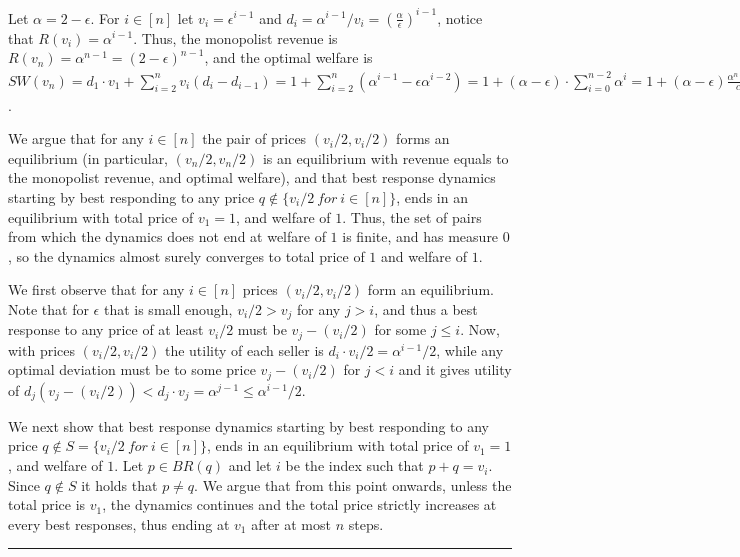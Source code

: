 \documentclass[11pt,a4paper]{article}
\newcommand{\qed}{\rule{1.5mm}{2mm}\vspace{0.1in}}
\newenvironment{proof}{\par\noindent{\bf Proof:}}{\qed}
\begin{document}
\begin{proof}
	Let $\alpha=2-\epsilon$.
	For $i\in [n]$ let $v_i=\epsilon^{i-1} $ and $d_i=\alpha^{i-1}/v_i = \left(\frac{\alpha}{\epsilon}\right)^{i-1}$, notice that $R(v_i)=\alpha^{i-1}$. Thus, the monopolist revenue is $R(v_n)=\alpha^{n-1} = (2-\epsilon)^{n-1}$, and the optimal welfare is
	$SW(v_n) = d_1\cdot v_1+ \sum_{i=2}^n v_i (d_{i}-d_{i-1}) = %
	1+ \sum_{i=2}^n \left(\alpha^{i-1}- \epsilon \alpha^{i-2}\right) =
	1+ (\alpha - \epsilon)\cdot \sum_{i=0}^{n-2} \alpha^{i} =
	1+ (\alpha - \epsilon)\frac{\alpha^{n-1} - 1 }{\alpha -1 } = 1+ 2 (1 - \epsilon)\frac{(2-\epsilon)^{n-1}-1}{1-\epsilon} =
	1+ 2\cdot ((2-\epsilon)^{n-1}-1)  =  2\cdot (2-\epsilon)^{n-1}-1   $.
	
	We argue that for any $i\in [n]$ the pair of prices $(v_i/2, v_i/2)$ forms an equilibrium (in particular, $(v_n/2, v_n/2)$ is an equilibrium with revenue equals to the monopolist revenue, and optimal welfare),
	and that best response dynamics starting by best responding to any price $q\notin \{v_i/2 \ for \ i\in [n]\}$, ends in an equilibrium with total price of $v_1=1$, and welfare of $1$. Thus, the set of pairs from which the dynamics does not end at welfare of $1$ is finite, and has measure $0$, so the dynamics almost surely converges to total price of $1$ and welfare of $1$.
	
	We first observe that for any $i\in [n]$ prices $(v_i/2, v_i/2)$ form an equilibrium.
	Note that for $\epsilon$ that is small enough, $v_i/2>v_j$ for any $j>i$, and thus a best response to any price of at least $v_i/2$ must be $v_j-(v_i/2)$ for some $j\leq i$.
	Now, with prices $(v_i/2, v_i/2)$ the utility of each seller is
	$d_i \cdot v_i/2 = \alpha^{i-1}/2$, while any optimal deviation must be to some price $v_j - (v_i/2)$ for $j<i$ and it
	gives utility of $d_j (v_j - (v_i/2)) < d_j \cdot v_j= \alpha^{j-1} \leq  \alpha^{i-1}/2$.
	
	We next show that best response dynamics starting by best responding to any price $q\notin S= \{v_i/2 \ for \ i\in [n]\} $, ends in an equilibrium with total price of $v_1=1$, and welfare of $1$.
	Let $p\in BR(q)$ and let $i$ be the index such that  $p+q=v_i$. Since $q\notin S$ it holds that $p\neq q$.
	We argue that from this point onwards, unless the total price is $v_1$, the dynamics continues and the total price strictly increases at every best responses, thus ending at $v_1$ after at most $n$ steps.




\end{proof}
\end{document}
